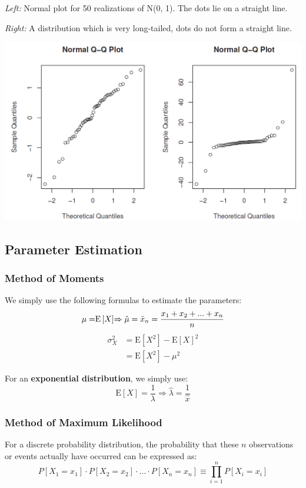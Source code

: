 \documentclass[11pt]{article}
\newcommand*\ev[1]{\mathrel{\text{E}\left[#1\right]}}
\begin{document}
\textit{Left:} Normal plot for 50 realizations of N(0, 1). The dots lie on a straight line.

\textit{Right:} A distribution which is very long-tailed, dots do not form a straight line.
\begin{center}
	\includegraphics[width=0.7\linewidth]{img/qq-plot-comparison}
\end{center}

\subsection{Parameter Estimation}

\subsubsection{Method of Moments}
We simply use the following formulas to estimate the parameters: 
\begin{equation*}
	\mu = \ev{X} \Rightarrow \hat{\mu} = \bar{x}_n = \dfrac{x_1+x_2 + ... + x_n}{n}\\
\end{equation*}
\begin{align*}
	\sigma_X^2 &= \ev{X^2} - \ev{X}^2\\
	 &= \ev{X^2} - \mu^2
\end{align*}

\noindent
For an \textbf{exponential distribution}, we simply use:
\begin{equation*}
	\ev{X} = \dfrac{1}{\lambda} \Rightarrow \hat{\lambda} = \dfrac{1}{\hat{x}}
\end{equation*}

\subsubsection{Method of Maximum Likelihood}
For a discrete probability distribution, the probability that these $n$ observations or events actually have occurred can be expressed as:
\begin{equation*}
	P[X_1 = x_1] \cdot P[X_2 = x_2] \cdot ... \cdot P[X_n = x_n] \equiv \prod_{i=1}^{n} P[X_i = x_i]
\end{equation*}
\end{document}
